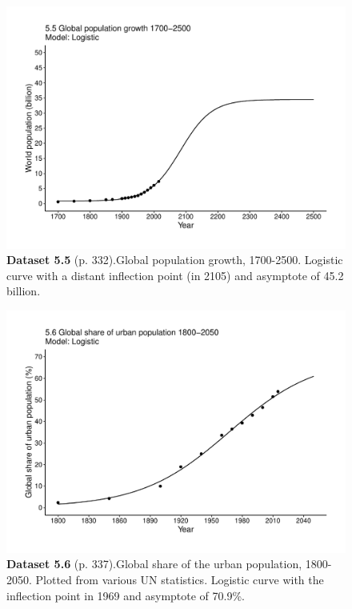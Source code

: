 \documentclass[aps,rmp,preprint,superscriptaddress,10pt,onecolumn]{article}
\begin{document}
\clearpage
\begin{figure}[h]
\includegraphics[width=\textwidth]{output/figs-ggplot/5.5.pdf}
\caption*{\textbf{Dataset 5.5} (p. 332).Global population growth, 1700-2500. Logistic curve with a distant inflection point (in 2105) and asymptote of 45.2 billion. }
\end{figure}
	
\clearpage
\begin{figure}[h]
\includegraphics[width=\textwidth]{output/figs-ggplot/5.6.pdf}
\caption*{\textbf{Dataset 5.6} (p. 337).Global share of the urban population, 1800-2050. Plotted from various UN statistics. Logistic curve with the inflection point in 1969 and asymptote of 70.9\%.}
\end{figure}
	
\end{document}
